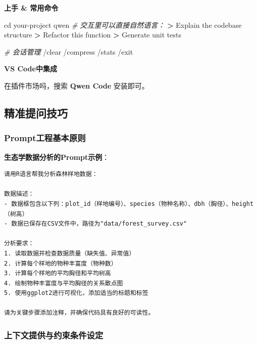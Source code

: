 \documentclass[
]{book}
\newenvironment{Shaded}{\begin{snugshade}}{\end{snugshade}}
\newcommand{\BuiltInTok}[1]{#1}
\newcommand{\CommentTok}[1]{\textcolor[rgb]{0.56,0.35,0.01}{\textit{#1}}}
\newcommand{\ExtensionTok}[1]{#1}
\newcommand{\NormalTok}[1]{#1}
\newcommand{\OperatorTok}[1]{\textcolor[rgb]{0.81,0.36,0.00}{\textbf{#1}}}
\begin{document}
\textbf{上手 \& 常用命令}

\begin{Shaded}
\begin{Highlighting}[]
\BuiltInTok{cd}\NormalTok{ your{-}project}
\ExtensionTok{qwen}
\CommentTok{\# 交互里可以直接自然语言：}
\OperatorTok{\textgreater{}}\NormalTok{ Explain }\ExtensionTok{the}\NormalTok{ codebase structure}
\OperatorTok{\textgreater{}}\NormalTok{ Refactor }\ExtensionTok{this}\NormalTok{ function}
\OperatorTok{\textgreater{}}\NormalTok{ Generate }\ExtensionTok{unit}\NormalTok{ tests}

\CommentTok{\# 会话管理}
\ExtensionTok{/clear}\NormalTok{   /compress   /stats   /exit}
\end{Highlighting}
\end{Shaded}

\textbf{VS Code中集成}

在插件市场吗，搜索 \textbf{Qwen Code} 安装即可。

\hypertarget{ux7cbeux51c6ux63d0ux95eeux6280ux5de7}{%
\subsection{精准提问技巧}\label{ux7cbeux51c6ux63d0ux95eeux6280ux5de7}}

\hypertarget{promptux5de5ux7a0bux57faux672cux539fux5219}{%
\subsubsection{Prompt工程基本原则}\label{promptux5de5ux7a0bux57faux672cux539fux5219}}

\textbf{生态学数据分析的Prompt示例}：

\begin{verbatim}
请用R语言帮我分析森林样地数据：

数据描述：
- 数据框包含以下列：plot_id（样地编号）、species（物种名称）、dbh（胸径）、height（树高）
- 数据已保存在CSV文件中，路径为"data/forest_survey.csv"

分析要求：
1. 读取数据并检查数据质量（缺失值、异常值）
2. 计算每个样地的物种丰富度（物种数）
3. 计算每个样地的平均胸径和平均树高
4. 绘制物种丰富度与平均胸径的关系散点图
5. 使用ggplot2进行可视化，添加适当的标题和标签

请为关键步骤添加注释，并确保代码具有良好的可读性。
\end{verbatim}

\hypertarget{ux4e0aux4e0bux6587ux63d0ux4f9bux4e0eux7ea6ux675fux6761ux4ef6ux8bbeux5b9a}{%
\subsubsection{上下文提供与约束条件设定}\label{ux4e0aux4e0bux6587ux63d0ux4f9bux4e0eux7ea6ux675fux6761ux4ef6ux8bbeux5b9a}}
\end{document}
